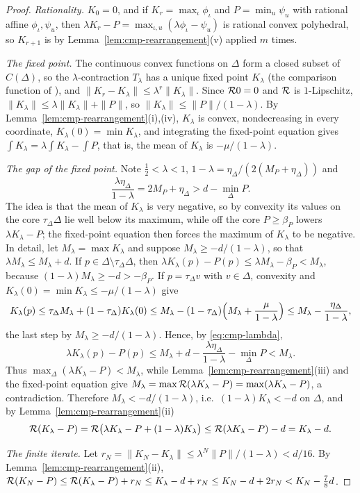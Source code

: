 \begin{proof}
\emph{Rationality.} $K_0=0$, and if $K_r=\max_\iota\phi_\iota$ and $P=\min_u\psi_u$ with rational affine
$\phi_\iota,\psi_u$, then $\lambda K_r-P=\max_{\iota,u}(\lambda\phi_\iota-\psi_u)$ is rational convex polyhedral, so
$K_{r+1}$ is by Lemma~\ref{lem:cmp-rearrangement}(v) applied $m$ times.

\emph{The fixed point.} The continuous convex functions on $\Delta$ form a closed subset of $C(\Delta)$, so the
$\lambda$-contraction $T_\lambda$ has a unique fixed point $K_\lambda$ (the comparison function of
\cite[\S2.2]{OpenAI2026}), and $\|K_r-K_\lambda\|\le\lambda^r\|K_\lambda\|$. Since $\mathcal{R}0=0$ and $\mathcal{R}$ is
$1$-Lipschitz, $\|K_\lambda\|\le\lambda\|K_\lambda\|+\|P\|$, so $\|K_\lambda\|\le\|P\|/(1-\lambda)$. By
Lemma~\ref{lem:cmp-rearrangement}(i),(iv), $K_\lambda$ is convex, nondecreasing in every coordinate,
$K_\lambda(0)=\min K_\lambda$, and integrating the fixed-point equation gives
$\int K_\lambda=\lambda\int K_\lambda-\int P$, that is, the mean of $K_\lambda$ is $-\mu/(1-\lambda)$.

\emph{The gap of the fixed point.} Note $\tfrac12<\lambda<1$, $1-\lambda=\eta_\Delta/(2(M_P+\eta_\Delta))$ and
\begin{equation}\label{eq:cmp-lambda}
 \frac{\lambda\eta_\Delta}{1-\lambda}=2M_P+\eta_\Delta>d-\min_\Delta P .
\end{equation}
The idea is that the mean of $K_\lambda$ is very negative, so by convexity its values on the core
$\tau_\Delta\Delta$ lie well below its maximum, while off the core $P\ge\beta_P$ lowers $\lambda K_\lambda-P$; the
fixed-point equation then forces the maximum of $K_\lambda$ to be negative. In detail, let $M_\lambda=\max K_\lambda$ and suppose $M_\lambda\ge-d/(1-\lambda)$, so that
$\lambda M_\lambda\le M_\lambda+d$. If $p\in\Delta\setminus\tau_\Delta\Delta$, then
$\lambda K_\lambda(p)-P(p)\le\lambda M_\lambda-\beta_P<M_\lambda$, because $(1-\lambda)M_\lambda\ge-d>-\beta_P$. If
$p=\tau_\Delta v$ with $v\in\Delta$, convexity and $K_\lambda(0)=\min K_\lambda\le-\mu/(1-\lambda)$ give
\[
 K_\lambda(p)\le\tau_\Delta M_\lambda+(1-\tau_\Delta)K_\lambda(0)
 \le M_\lambda-(1-\tau_\Delta)\Bigl(M_\lambda+\frac{\mu}{1-\lambda}\Bigr)\le M_\lambda-\frac{\eta_\Delta}{1-\lambda},
\]
the last step by $M_\lambda\ge-d/(1-\lambda)$. Hence, by \eqref{eq:cmp-lambda},
\[
 \lambda K_\lambda(p)-P(p)\le M_\lambda+d-\frac{\lambda\eta_\Delta}{1-\lambda}-\min_\Delta P<M_\lambda .
\]
Thus $\max_\Delta(\lambda K_\lambda-P)<M_\lambda$, while Lemma~\ref{lem:cmp-rearrangement}(iii) and the fixed-point
equation give $M_\lambda=\max\mathcal{R}(\lambda K_\lambda-P)=\max(\lambda K_\lambda-P)$, a contradiction. Therefore
$M_\lambda<-d/(1-\lambda)$, i.e.\ $(1-\lambda)K_\lambda<-d$ on $\Delta$, and by Lemma~\ref{lem:cmp-rearrangement}(ii)
\[
 \mathcal{R}(K_\lambda-P)=\mathcal{R}\bigl(\lambda K_\lambda-P+(1-\lambda)K_\lambda\bigr)\le\mathcal{R}(\lambda K_\lambda-P)-d=K_\lambda-d .
\]

\emph{The finite iterate.} Let $r_N=\|K_N-K_\lambda\|\le\lambda^N\|P\|/(1-\lambda)<d/16$. By
Lemma~\ref{lem:cmp-rearrangement}(ii),
$\mathcal{R}(K_N-P)\le\mathcal{R}(K_\lambda-P)+r_N\le K_\lambda-d+r_N\le K_N-d+2r_N<K_N-\tfrac78d$.
\end{proof}

